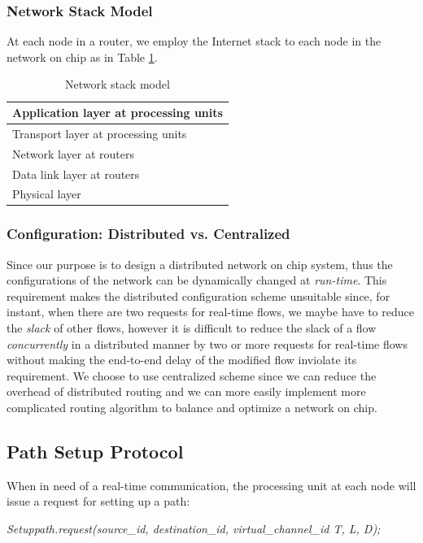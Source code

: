 \documentclass[conference, twocolumn]{IEEEtran}
\theoremstyle{definition}
\begin{document}
\subsubsection{Network Stack Model}
At each node in a router, we employ the Internet stack to each node in the 
network on chip as in Table \ref{table:NetworkStack}.
\begin{table}[h]
\begin{center}
  \begin{tabular}{ | l | }
    \hline
    Application layer at processing units \\ \hline
    Transport layer at processing units \\ \hline
    Network layer at routers \\ \hline
	Data link layer at routers \\ \hline
	Physical layer \\
    \hline
  \end{tabular}
\end{center}
\caption{Network stack model}
\label{table:NetworkStack}
\end{table}

\subsubsection{Configuration: Distributed vs. Centralized}
Since our purpose is to design a distributed network on chip system, thus the
configurations of the network can be dynamically changed at {\em run-time}.
This requirement makes the distributed configuration scheme unsuitable since,
for instant, when there are two requests for real-time flows, we maybe have to
reduce the {\em slack} of other flows, however it is difficult to reduce the
slack of a flow {\em concurrently} in a distributed manner by two or more
requests for real-time flows without making the end-to-end delay of the
modified flow inviolate its requirement. We choose to use centralized scheme
since we can reduce the overhead of distributed routing and we can more easily
implement more complicated routing algorithm to balance and optimize a network
on chip.

\subsection{Path Setup Protocol}
When in need of a real-time communication, the processing unit at each node 
will issue a request for setting up a path:

{\em Setuppath.request(source\_id, destination\_id, virtual\_channel\_id T, L,
D);}
\end{document}
